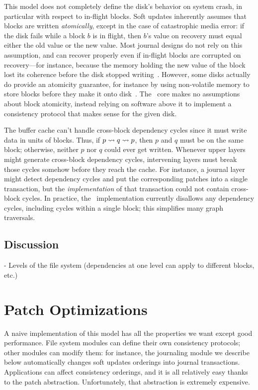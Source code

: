 This model does not completely define the disk's behavior on system crash,
 in particular with respect to in-flight blocks.
%
Soft updates inherently assumes that blocks are written
\emph{atomically}, except in the case of catastrophic media error:
%
if the disk fails while a block $b$ is in flight, then $b$'s
value on recovery must equal either the old value or the new value.
%
Most journal designs do not rely on this assumption, and can recover
 properly even if in-flight blocks are corrupted on recovery---for instance,
 because the memory holding the new value of the block lost its coherence
 before the disk stopped writing~\cite{tso}.
%
However, some disks actually do provide an atomicity guarantee, for
 instance by using non-volatile memory to store blocks before they make it
 onto disk~\cite{???}.
%
The \Kudos\ core makes no assumptions about block atomicity, instead relying
 on software above it to implement a consistency protocol that makes sense
 for the given disk.


The buffer cache can't handle cross-block dependency cycles since it must
write data in units of blocks.
%
Thus, if $p \leadsto q \leadsto p$, then $p$ and $q$ must be on the same
block; otherwise, neither $p$ nor $q$ could ever get written.
%
Whenever upper layers might generate cross-block dependency cycles,
intervening layers must break those cycles somehow before they reach the
cache.
%
For instance, a journal layer might detect dependency cycles and put the
corresponding patches into a single transaction, but the
\emph{implementation} of that transaction could not contain cross-block
cycles.
%
In practice, the \Kudos\ implementation currently disallows any dependency
cycles, including cycles within a single block; this simplifies many graph
traversals.





\subsection{Discussion}

- Levels of the file system (dependencies at one level can apply to
  different blocks, etc.)



\section{Patch Optimizations}
\label{sec:patch:optimizations}

A naive implementation of this model has all the properties we want except
good performance.
%
File system modules can define their own consistency protocols; other
modules can modify them: for instance, the journaling module we describe
below automatically changes soft updates orderings into journal
transactions.
%
Applications can affect consistency orderings, and it is all relatively
easy thanks to the patch abstraction.
%
Unfortunately, that abstraction is extremely expensive.


